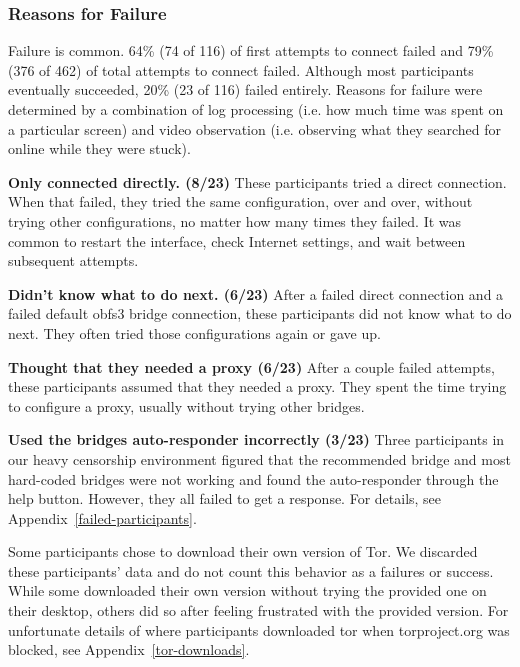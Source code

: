 \documentclass[USenglish,oneside,twocolumn]{article}
\begin{document}
\subsubsection{Reasons for Failure} 
Failure is common. 64\% (74 of 116) of first attempts to connect failed and 79\% (376 of 462) of total attempts to connect failed. Although most participants eventually succeeded, 20\% (23 of 116) failed entirely. Reasons for failure were determined by a combination of log processing (i.e. how much time was spent on a particular screen) and video observation (i.e. observing what they searched for online while they were stuck). \\ 

\begin{description}
\item {\bfseries Only connected directly. (8/23)} These participants tried a direct connection. When that failed, they tried the same configuration, over and over, without trying other configurations, no matter how many times they failed. It was common to restart the interface, check Internet settings, and wait between subsequent attempts. 
\item {\bfseries Didn't know what to do next. (6/23)} After a failed direct connection and a failed default obfs3 bridge connection, these participants did not know what to do next. They often tried those configurations again or gave up. 
\item {\bfseries Thought that they needed a proxy (6/23)} After a couple failed attempts, these participants assumed that they needed a proxy. They spent the time trying to configure a proxy, usually without trying other bridges. 
\item {\bfseries Used the bridges auto-responder incorrectly (3/23)} Three participants in our heavy censorship environment figured that the recommended bridge and most hard-coded bridges were not working and found the auto-responder through the help button. However, they all failed to get a response. For details, see Appendix~\ref{failed-participants}.
\end{description} 

Some participants chose to download their own version of Tor. We discarded these participants' data and do not count this behavior as a failures or success. While some downloaded their own version without trying the provided one on their desktop, others did so after feeling frustrated with the provided version. For unfortunate details of where participants downloaded tor when torproject.org was blocked, see Appendix~\ref{tor-downloads}.
\end{document}
